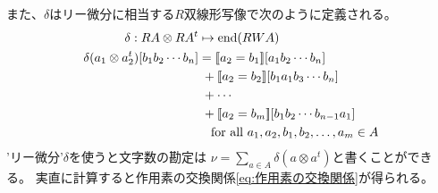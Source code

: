 		また、$\delta$はリー微分に相当する$R$双線形写像で次のように定義される。
		\begin{equation*}\begin{split} %
			\delta: RA\otimes RA^t &\mapsto \myop{end}(RWA) \\
			\delta(a_1\otimes a_2^t)[b_1b_2\cdots b_n]
			&= \jump{a_2=b_1}[a_1b_2\cdots b_n] \\
			&\;+ \jump{a_2=b_2}[b_1a_1b_3\cdots b_n] \\
			&\;+ \cdots \\
			&\;+ \jump{a_2=b_m}[b_1b_2\cdots b_{n-1}a_1] \\
			&\quad\text{for all }a_1,a_2,b_1,b_2,\dots,a_m\in A
		\end{split}\end{equation*} %
		'リー微分'$\delta$を使うと文字数の勘定は
		$\nu=\sum_{a\in A}\delta(a\otimes a^t)$と書くことができる。
		実直に計算すると作用素の交換関係\eqref{eq:作用素の交換関係}が得られる。
